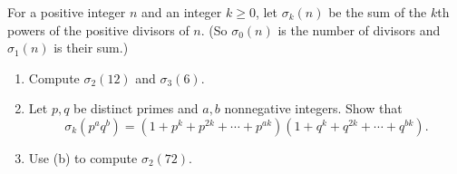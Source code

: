 For a positive integer $n$ and an integer $k\ge0$, let $\sigma_k(n)$ be the sum of the $k$th powers of the positive divisors of $n$. (So $\sigma_0(n)$ is the number of divisors and $\sigma_1(n)$ is their sum.)
\begin{enumerate}
\item[(a)] Compute $\sigma_2(12)$ and $\sigma_3(6)$.
\item[(b)] Let $p,q$ be distinct primes and $a,b$ nonnegative integers. Show that
\[\sigma_k\left(p^aq^b\right)=\left(1+p^k+p^{2k}+\cdots+p^{ak}\right)\left(1+q^k+q^{2k}+\cdots+q^{bk}\right).\]
\item[(c)] Use (b) to compute $\sigma_2(72)$.
\end{enumerate}
